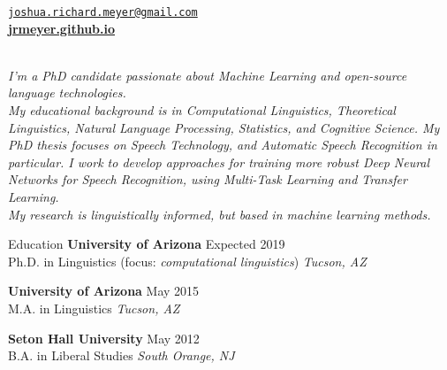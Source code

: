 \documentclass{resume} %
\begin{document}
\vspace{-.5cm}
\begin{center}
  \href{mailto:joshua.richard.meyer@gmail.com}{\nolinkurl{joshua.richard.meyer@gmail.com}}\\
  \href{https://jrmeyer.github.io}{\textbf{jrmeyer.github.io}} \\
  \href{https://github.com/JRMeyer}{\faGithub} \hspace{.25cm} \href{https://www.linkedin.com/in/josh-r-meyer/}{\faLinkedin} \\

\vspace{.05cm}

\textit{I'm a PhD candidate passionate about Machine Learning and open-source language technologies. \\ My educational background is in Computational Linguistics, Theoretical Linguistics, Natural Language Processing, Statistics, and Cognitive Science. My PhD thesis focuses on Speech Technology, and Automatic Speech Recognition in particular. I work to develop approaches for training more robust Deep Neural Networks for Speech Recognition, using Multi-Task Learning and Transfer Learning. \\ My research is linguistically informed, but based in machine learning methods. }

\end{center}


\begin{rSection}{Education}
{\bf University of Arizona} \hfill {Expected 2019} \\ 
Ph.D. in Linguistics (focus: \textit{computational linguistics}) \hfill {\em Tucson, AZ}

{\bf University of Arizona} \hfill {May 2015} \\ 
M.A. in Linguistics \hfill {\em Tucson, AZ}

{\bf Seton Hall University} \hfill {May 2012} \\ 
B.A. in Liberal Studies  \hfill {\em South Orange, NJ} \\
\end{rSection}

\end{document}
